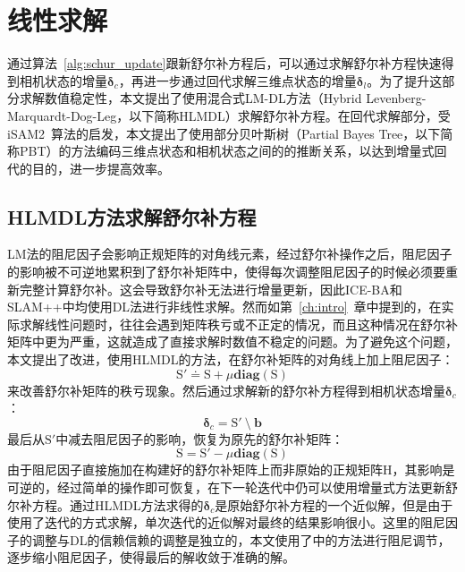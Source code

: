 \section{线性求解}

通过算法~\ref{alg:schur_update}跟新舒尔补方程后，可以通过求解舒尔补方程快速得到相机状态的增量$\bm{\delta}_c$，再进一步通过回代求解三维点状态的增量$\bm{\delta}_l$。为了提升这部分求解数值稳定性，本文提出了使用混合式LM-DL方法（Hybrid Levenberg-Marquardt-Dog-Leg，以下简称HLMDL）求解舒尔补方程。在回代求解部分，受iSAM2\citep{kaess2012isam2}~算法的启发，本文提出了使用部分贝叶斯树（Partial Bayes Tree，以下简称PBT）的方法编码三维点状态和相机状态之间的的推断关系，以达到增量式回代的目的，进一步提高效率。

\subsection{HLMDL方法求解舒尔补方程}

LM法的阻尼因子会影响正规矩阵的对角线元素，经过舒尔补操作之后，阻尼因子的影响被不可逆地累积到了舒尔补矩阵中，使得每次调整阻尼因子的时候必须要重新完整计算舒尔补。这会导致舒尔补无法进行增量更新，因此ICE-BA\citep{liu2018ice}和SLAM++中均使用DL法进行非线性求解。然而如第~\ref{ch:intro}~章中提到的，在实际求解线性问题时，往往会遇到矩阵秩亏或不正定的情况，而且这种情况在舒尔补矩阵中更为严重，这就造成了直接求解时数值不稳定的问题。为了避免这个问题，本文提出了改进，使用HLMDL的方法，在舒尔补矩阵的对角线上加上阻尼因子：
\begin{equation}
    \mathrm{S}' \doteq \mathrm{S}+\mu\mathbf{diag}(\mathrm{S})
\end{equation}
来改善舒尔补矩阵的秩亏现象。然后通过求解新的舒尔补方程得到相机状态增量$\bm{\delta}_c$：
\begin{equation}
    \bm{\delta}_c = \mathrm{S}' \:\setminus\: \bm{b}
    \label{eq:hlmdl}
\end{equation}
最后从$\mathrm{S}'$中减去阻尼因子的影响，恢复为原先的舒尔补矩阵：
\begin{equation}
    \mathrm{S} = \mathrm{S}'-\mu\mathbf{diag}(\mathrm{S})
\end{equation}
由于阻尼因子直接施加在构建好的舒尔补矩阵上而非原始的正规矩阵$\mathrm{H}$，其影响是可逆的，经过简单的操作即可恢复，在下一轮迭代中仍可以使用增量式方法更新舒尔补方程。通过HLMDL方法求得的$\bm{\delta}_c$是原始舒尔补方程的一个近似解，但是由于使用了迭代的方式求解，单次迭代的近似解对最终的结果影响很小。这里的阻尼因子的调整与DL的信赖信赖的调整是独立的，本文使用了\citep{tingleff2004methods}中的方法进行阻尼调节，逐步缩小阻尼因子，使得最后的解收敛于准确的解。

